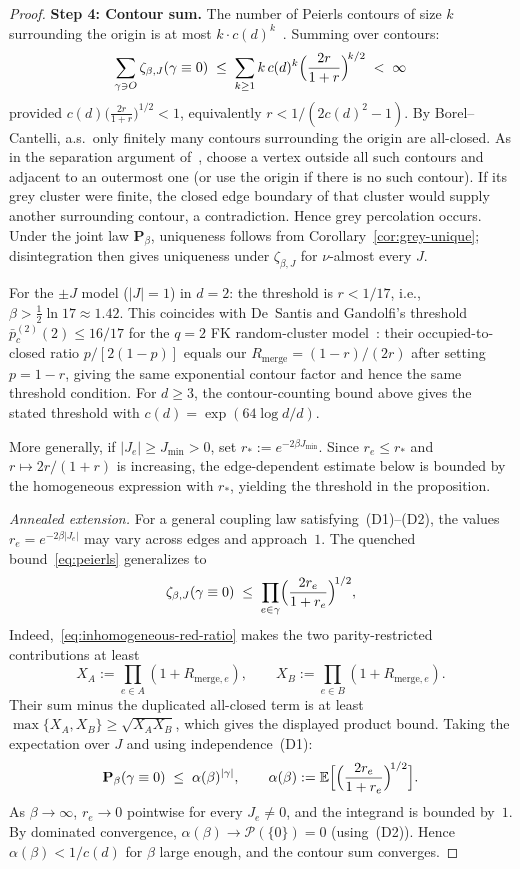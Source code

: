 \documentclass[11pt]{article}
\numberwithin{theorem}{section}
\theoremstyle{remark}
\begin{document}
\begin{proof}
\smallskip\noindent
\textbf{Step 4: Contour sum.}
The number of Peierls contours of size $k$ surrounding the origin is at most $k \cdot c(d)^k$~\cite[p.~1788, 1791]{DSG1999}.
Summing over contours:
\[
  \sum_{\gamma \ni O} \zeta_{\beta,J}(\gamma \equiv 0)
  \;\leq\; \sum_{k \geq 1} k\,c(d)^k \Bigl(\frac{2r}{1+r}\Bigr)^{\!k/2}
  \;<\; \infty
\]
provided $c(d)\bigl(\frac{2r}{1+r}\bigr)^{1/2} < 1$, equivalently $r < 1/(2c(d)^2 - 1)$.
By Borel--Cantelli, a.s.\ only finitely many contours surrounding the origin are all-closed.
As in the separation argument of~\cite[p.~1788]{DSG1999}, choose a vertex outside all such contours and adjacent to an outermost one (or use the origin if there is no such contour).  If its grey cluster were finite, the closed edge boundary of that cluster would supply another surrounding contour, a contradiction.  Hence grey percolation occurs.
Under the joint law $\mathbf{P}_\beta$, uniqueness follows from Corollary~\ref{cor:grey-unique}; disintegration then gives uniqueness under $\zeta_{\beta,J}$ for $\nu$-almost every $J$.

For the $\pm J$ model ($|J| = 1$) in $d = 2$: the threshold is $r < 1/17$, i.e., $\beta > \tfrac{1}{2}\ln 17 \approx 1.42$.
This coincides with De~Santis and Gandolfi's threshold $\bar{p}_c^{(2)}(2) \leq 16/17$ for the $q = 2$ FK random-cluster model~\cite[Corollary~2.3]{DSG1999}: their occupied-to-closed ratio $p/[2(1-p)]$ equals our $R_{\mathrm{merge}} = (1-r)/(2r)$ after setting $p=1-r$, giving the same exponential contour factor and hence the same threshold condition.
For $d \geq 3$, the contour-counting bound above gives the stated threshold with $c(d)=\exp(64\log d/d)$.

More generally, if $|J_e|\geq J_{\min}>0$, set $r_*:=e^{-2\beta J_{\min}}$.  Since $r_e\leq r_*$ and $r\mapsto 2r/(1+r)$ is increasing, the edge-dependent estimate below is bounded by the homogeneous expression with $r_*$, yielding the threshold in the proposition.

\smallskip\noindent
\textit{Annealed extension.}
For a general coupling law satisfying~\textup{(D1)--(D2)}, the values $r_e = e^{-2\beta|J_e|}$ may vary across edges and approach~$1$.
The quenched bound~\eqref{eq:peierls} generalizes to
\[
  \zeta_{\beta,J}(\gamma \equiv 0)
  \;\leq\;
  \prod_{e \in \gamma} \Bigl(\frac{2r_e}{1+r_e}\Bigr)^{\!1/2},
\]
Indeed,~\eqref{eq:inhomogeneous-red-ratio} makes the two parity-restricted contributions at least
\[
  X_A:=\prod_{e\in A}(1+R_{\mathrm{merge},e}),
  \qquad
  X_B:=\prod_{e\in B}(1+R_{\mathrm{merge},e}).
\]
Their sum minus the duplicated all-closed term is at least $\max\{X_A,X_B\}\geq\sqrt{X_AX_B}$, which gives the displayed product bound.
Taking the expectation over $J$ and using independence~(D1):
\[
  \mathbf{P}_\beta(\gamma \equiv 0)
  \;\leq\; \alpha(\beta)^{|\gamma|},
  \qquad
  \alpha(\beta) := \mathbb{E}\Bigl[\Bigl(\frac{2r_e}{1+r_e}\Bigr)^{\!1/2}\Bigr].
\]
As $\beta \to \infty$, $r_e \to 0$ pointwise for every $J_e \neq 0$, and the integrand is bounded by~$1$.
By dominated convergence, $\alpha(\beta) \to \mathscr{P}(\{0\}) = 0$ (using~(D2)).
Hence $\alpha(\beta) < 1/c(d)$ for $\beta$ large enough, and the contour sum converges.
\end{proof}
\end{document}
